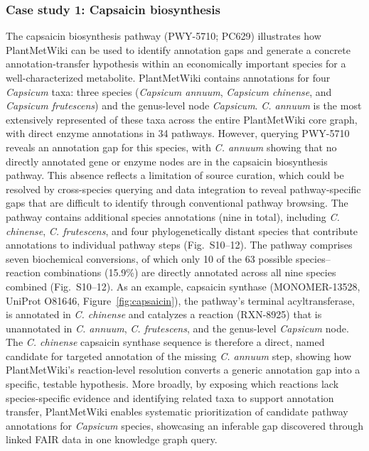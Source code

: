 \documentclass[11pt,a4paper]{article}
\begin{document}
\subsubsection*{Case study 1: Capsaicin biosynthesis}
\vspace*{-1em}
The capsaicin biosynthesis pathway (PWY-5710; PC629) illustrates how PlantMetWiki can be used to
identify annotation gaps and generate a concrete annotation-transfer hypothesis within an economically
important species for a well-characterized metabolite. PlantMetWiki contains annotations for four
\textit{Capsicum} taxa: three species (\textit{Capsicum annuum}, \textit{Capsicum chinense}, and
\textit{Capsicum frutescens}) and the genus-level node \textit{Capsicum}. \textit{C. annuum} is the
most extensively represented of these taxa across the entire PlantMetWiki core graph, with direct
enzyme annotations in 34 pathways. However, querying PWY-5710 reveals an annotation gap for this
species, with \textit{C. annuum} showing that no directly annotated gene or enzyme nodes are in the capsaicin
biosynthesis pathway. This absence reflects a limitation of source curation, which could be resolved by cross-species querying and data integration to reveal pathway-specific gaps that are difficult to identify through
conventional pathway browsing. The pathway contains additional species annotations (nine in total), including
\textit{C. chinense}, \textit{C. frutescens}, and four phylogenetically distant species that
contribute annotations to individual pathway steps (Fig.~S10–12). The pathway comprises seven biochemical
conversions, of which only 10 of the 63 possible species--reaction combinations (15.9\%) are directly
annotated across all nine species combined (Fig.~S10--12). As an example, capsaicin synthase (MONOMER-13528, UniProt
O81646, Figure~\ref{fig:capsaicin}), the pathway's terminal acyltransferase, is annotated in \textit{C.
chinense} and catalyzes a reaction (RXN-8925) that is unannotated in \textit{C. annuum}, \textit{C.
frutescens}, and the genus-level \textit{Capsicum} node. The \textit{C. chinense} capsaicin synthase
sequence is therefore a direct, named candidate for targeted annotation of the missing \textit{C.
annuum} step, showing how PlantMetWiki's reaction-level resolution converts a generic annotation gap
into a specific, testable hypothesis. More broadly, by exposing which reactions lack species-specific
evidence and identifying related taxa to support annotation transfer, PlantMetWiki enables systematic
prioritization of candidate pathway annotations for \textit{Capsicum} species, showcasing an inferable gap discovered through linked FAIR data in one knowledge graph query.
\end{document}
